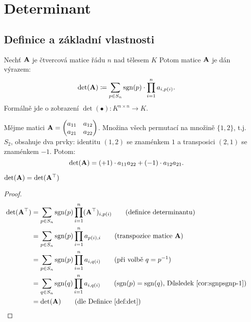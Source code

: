 \section{Determinant}

\subsection{Definice a základní vlastnosti}

\begin{definition}
    \label{def:det}
    Nechť $\mathbf{A}$ je čtvercová matice řádu $n$ nad tělesem $K$
    Potom  matice $\mathbf{A}$ je dán výrazem:
    $$\det(\mathbf{A}) \coloneqq \sum_{p \in S_n} \mathop{\mathrm{sgn}}(p)\cdot 
    \prod_{i=1}^n a_{i, p(i)}.$$
    Formálně jde o zobrazení $\det(\bullet): K^{n \times n} \rightarrow K.$
\end{definition}

\begin{remark}
    Mějme matici $\mathbf{A} = \begin{pmatrix} a_{11} &a_{12} \\ a_{21} &a_{22}
    \end{pmatrix}$. Množina všech permutací na množině $\{1, 2\}$, t.j.
    $S_2$, obsahuje dva prvky: identitu $(1,2)$ se znaménkem $1$ a 
    transposici $(2,1)$ se znaménkem $-1$. Potom:
    $$\det(\mathbf{A}) = (+1) \cdot a_{11}a_{22} + (-1) \cdot a_{12}a_{21}.$$
\end{remark}

\begin{observation}
    \label{obs:detaeqdetat}
    $\det(\mathbf{A}) = \det(\mathbf{A}^{\top})$
\end{observation}

\begin{proof}
    \begin{align*}
        \det(\mAt) &= \sum_{p \in S_n} \sgn(p) \prod_{i=1}^n 
            (\mAt)_{i,p(i)} \tag{definice determinantu}\\
            &= \sum_{p \in S_n} \sgn(p) \prod_{i=1}^n a_{p(i),i} 
            \tag{transpozice matice $\mA$} \\
            &= \sum_{p \in S_n} \sgn(p) \prod_{i=1}^n a_{i,q(i)} 
            \tag{při volbě $q = p^{-1}$} \\
            &= \sum_{q \in S_n} \sgn(q) \prod_{i=1}^n a_{i,q(i)} 
            \tag{$\sgn(p) = \sgn(q)$, Důsledek~\ref{cor:sgnpsgnp-1}} \\
            &= \det(\mA) \tag{dle Definice \ref{def:det}}
    \end{align*}
\end{proof}

